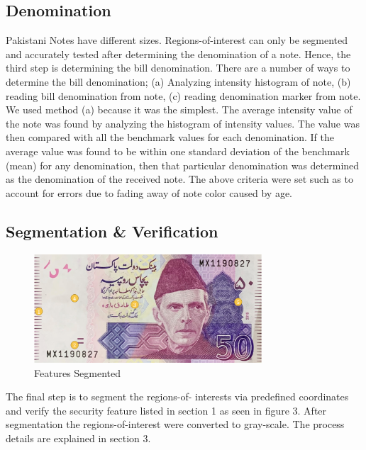 \documentclass{article}
\begin{document}
\subsection{Denomination}
Pakistani Notes have different sizes. Regions-of-interest can only be segmented and accurately tested after determining the denomination of a note. Hence, the third step is determining the bill denomination. There are a number of ways to determine the bill denomination; (a) Analyzing intensity histogram of note, (b) reading bill denomination from note, (c) reading denomination marker from note. We used method (a) because it was the simplest. The average intensity value of the note was found by analyzing the histogram of intensity values. The value was then compared with all the benchmark values for each denomination. If the average value was found to be within one standard deviation of the benchmark (mean) for any denomination, then that particular denomination was determined as the denomination of the received note. The above criteria were set such as to account for errors due to fading away of note color caused by age.

\subsection{Segmentation \& Verification}
\begin{figure}[h!]

\begin{minipage}[b]{1.0\linewidth}
  \centering
  \centerline{\includegraphics[width=8.5cm]{note.png}}
  \vspace{-3mm}
\end{minipage}
%
\caption{Features Segmented}
\label{fig:note}
\vspace{-3mm}
\end{figure}

The final step is to segment the regions-of- interests via predefined coordinates and verify the security feature listed in section 1 as seen in figure 3. After segmentation the regions-of-interest were converted to gray-scale. The process details are explained in section 3.
\end{document}
